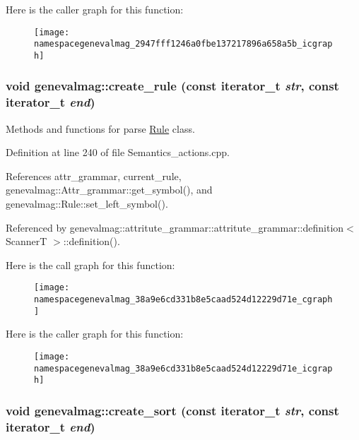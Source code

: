Here is the caller graph for this function:\nopagebreak
\begin{figure}[H]
\begin{center}
\leavevmode
\texttt{[image: namespacegenevalmag\_2947fff1246a0fbe137217896a658a5b\_icgraph]}
\end{center}
\end{figure}
\hypertarget{namespacegenevalmag_38a9e6cd331b8e5caad524d12229d71e}{
\subsubsection[{create\_\-rule}]{\setlength{\rightskip}{0pt plus 5cm}void genevalmag::create\_\-rule (const iterator\_\-t {\em str}, \/  const iterator\_\-t {\em end})}}
\label{namespacegenevalmag_38a9e6cd331b8e5caad524d12229d71e}


Methods and functions for parse \hyperlink{classgenevalmag_1_1Rule}{Rule} class. 

Definition at line 240 of file Semantics\_\-actions.cpp.

References attr\_\-grammar, current\_\-rule, genevalmag::Attr\_\-grammar::get\_\-symbol(), and genevalmag::Rule::set\_\-left\_\-symbol().

Referenced by genevalmag::attritute\_\-grammar::attritute\_\-grammar::definition$<$ ScannerT $>$::definition().

Here is the call graph for this function:\nopagebreak
\begin{figure}[H]
\begin{center}
\leavevmode
\texttt{[image: namespacegenevalmag\_38a9e6cd331b8e5caad524d12229d71e\_cgraph]}
\end{center}
\end{figure}


Here is the caller graph for this function:\nopagebreak
\begin{figure}[H]
\begin{center}
\leavevmode
\texttt{[image: namespacegenevalmag\_38a9e6cd331b8e5caad524d12229d71e\_icgraph]}
\end{center}
\end{figure}
\hypertarget{namespacegenevalmag_8fe47e97e9f000f1eb35ee9e86b2a5c0}{
\subsubsection[{create\_\-sort}]{\setlength{\rightskip}{0pt plus 5cm}void genevalmag::create\_\-sort (const iterator\_\-t {\em str}, \/  const iterator\_\-t {\em end})}}
\label{namespacegenevalmag_8fe47e97e9f000f1eb35ee9e86b2a5c0}


